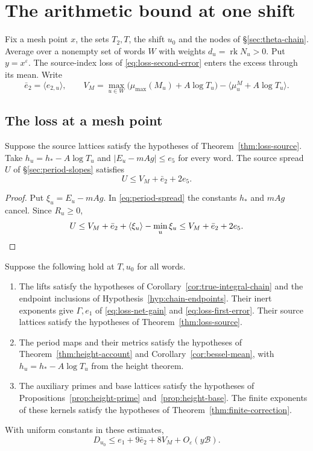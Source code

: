 \section{The arithmetic bound at one shift}\label{sec:assembly}

Fix a mesh point $x$, the sets $T_2,T$, the shift $u_0$ and the
nodes of \S\ref{sec:theta-chain}. Average over a nonempty set of words
$W$ with weights $d_u=\operatorname{rk}N_u>0$. Put $y=x^\varepsilon$.
The source-index loss of \eqref{eq:loss-second-error} enters the
excess through its mean. Write
\[
 \bar e_2=\langle e_{2,u}\rangle,\qquad
 V_M=\max_{u\in W}\bigl(\mu_{\max}(M_u)+A\log T_u\bigr)
              -\langle\mu^M_u+A\log T_u\rangle .
\]

\subsection{The loss at a mesh point}

\begin{lemma}\label{lem:assembly-spread}
Suppose the source lattices satisfy the hypotheses of
Theorem~\ref{thm:loss-source}. Take $h_u=h_*-A\log T_u$ and
$|E_u-mAg|\le e_5$ for every word. The source spread $U$ of
\S\ref{sec:period-slopes} satisfies
\[
                     U\le V_M+\bar e_2+2e_5 .
\]
\end{lemma}

\begin{proof}
Put $\xi_u=E_u-mAg$. In \eqref{eq:period-spread} the constants
$h_*$ and $mAg$ cancel. Since $R_u\ge0$,
\[
 U\le V_M+\bar e_2+\langle\xi_u\rangle-\min_u\xi_u
      \le V_M+\bar e_2+2e_5 .\qedhere
\]
\end{proof}

\begin{proposition}\label{prop:assembly-excess}
Suppose the following hold at $T,u_0$ for all words.
\begin{enumerate}[label=\textup{(\roman*)},nosep]
\item The lifts satisfy the hypotheses of
Corollary~\ref{cor:true-integral-chain} and the endpoint inclusions
of Hypothesis~\ref{hyp:chain-endpoints}. Their inert exponents give
$\Gamma,e_1$ of \eqref{eq:loss-net-gain} and \eqref{eq:loss-first-error}.
Their source lattices satisfy the hypotheses of Theorem~\ref{thm:loss-source}.
\item The period maps and their metrics satisfy the hypotheses of
Theorem~\ref{thm:height-account} and Corollary~\ref{cor:bessel-mean},
with $h_u=h_*-A\log T_u$ from the height theorem.
\item The auxiliary primes and base lattices satisfy the hypotheses
of Propositions~\ref{prop:height-prime} and~\ref{prop:height-base}.
The finite exponents of these kernels satisfy the hypotheses of
Theorem~\ref{thm:finite-correction}.
\end{enumerate}
With uniform constants in these estimates,
\begin{equation}\label{eq:assembly-excess}
 D_{u_0}\le e_1+9\bar e_2+8V_M+O_\varepsilon(y\mathcal B).
\end{equation}
\end{proposition}

